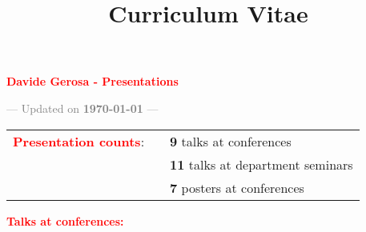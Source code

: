 \documentclass[11pt,a4paper,sans]{moderncv}   %
\title{Curriculum Vitae}
\begin{document}
\textcolor{red}{\begin{center}{\huge  \textbf{Davide Gerosa - Presentations}}\end{center}}

\vspace{-0.5cm}

\begin{center}\textcolor{gray}{ --- Updated on \textbf{\today} ---}\end{center}

\begin{tabular}{rcl}
\textcolor{red}{\textbf{Presentation counts}}: &\hspace{0.3cm} 
&{\textbf{9} talks at conferences} 
\\
& &{\textbf{11} talks at department seminars}
 \\
& &{\textbf{7} posters at conferences}
\end{tabular}


\vspace{0.1cm}
\textcolor{red}{\textbf{Talks at conferences:}}
\vspace{-0.5cm}
\end{document}
